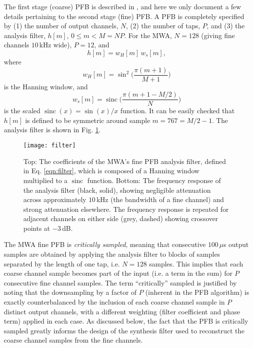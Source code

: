 \documentclass{pasa}%
\DeclareMathOperator{\sinc}{sinc}
\begin{document}
The first stage (coarse) PFB is described in \citet{Prabu2015}, and here we only document a few details pertaining to the second stage (fine) PFB.
A PFB is completely specified by (1) the number of output channels, $N$, (2) the number of taps, $P$, and (3) the analysis filter, $h[m]$, $0 \le m < M=NP$.
For the MWA, $N=128$ (giving fine channels $10\,$kHz wide), $P=12$, and
\begin{equation}
    h[m] = w_H[m]\,w_s[m],
    \label{eqn:filter}
\end{equation}
where
\begin{equation*}
    w_H[m] = \sin^2\bigg(\frac{\pi (m+1)}{M+1}\bigg)
\end{equation*}
is the Hanning window, and
\begin{equation*}
    w_s[m] = \sinc\bigg(\frac{\pi(m + 1 - M/2)}{N}\bigg)
\end{equation*}
is the scaled $\sinc(x) = \sin(x)/x$ function.
It can be easily checked that $h[m]$ is defined to be symmetric around sample $m = 767 = M/2-1$.
The analysis filter is shown in Fig. \ref{fig:filter}.
\begin{figure}[t]
    \centering
    \texttt{[image: filter]}
    \caption{Top: The coefficients of the MWA's fine PFB analysis filter, defined in Eq. \eqref{eqn:filter}, which is composed of a Hanning window multiplied to a $\sinc$ function. Bottom: The frequency response of the analysis filter (black, solid), showing negligible attenuation across approximately $10\,$kHz (the bandwidth of a fine channel) and strong attenuation elsewhere. The frequency response is repeated for adjacent channels on either side (grey, dashed) showing crossover points at $-3\,$dB.}
    \label{fig:filter}
\end{figure}

The MWA fine PFB is \textit{critically sampled}, meaning that consecutive $100\,\mu$s output samples are obtained by applying the analysis filter to blocks of samples separated by the length of one tap, i.e. $N = 128$ samples.
This implies that each coarse channel sample becomes part of the input (i.e. a term in the sum) for $P$ consecutive fine channel samples.
The term ``critically'' sampled is justified by noting that the downsampling by a factor of $P$ (inherent in the PFB algorithm) is exactly counterbalanced by the inclusion of each coarse channel sample in $P$ distinct output channels, with a different weighting (filter coefficient and phase term) applied in each case.
As discussed below, the fact that the PFB is critically sampled greatly informs the design of the synthesis filter used to reconstruct the coarse channel samples from the fine channels.
\end{document}
